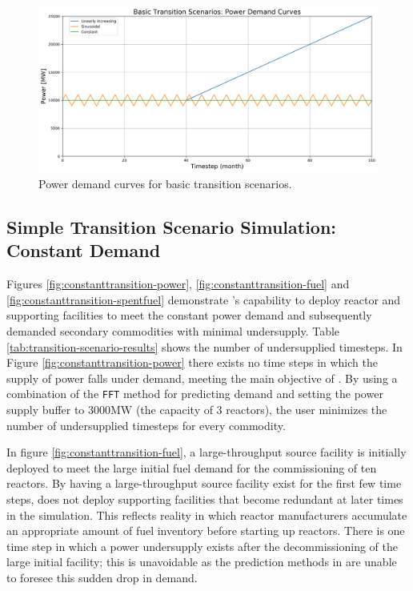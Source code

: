     \begin{figure}[]
        \begin{center}
            \includegraphics[scale=0.5]{./figures/powerplots.png}
        \end{center}
            \caption{Power demand curves for basic transition scenarios.}
        \label{fig:powerplots}
    \end{figure}

\subsection{Simple Transition Scenario Simulation: Constant Demand}
Figures \ref{fig:constanttransition-power}, \ref{fig:constanttransition-fuel}
and \ref{fig:constanttransition-spentfuel} demonstrate \deploy's capability 
to deploy reactor and supporting facilities to meet the
constant power demand and subsequently demanded 
secondary commodities with minimal undersupply. 
Table \ref{tab:transition-scenario-results} shows the number of 
undersupplied timesteps. 
In Figure \ref{fig:constanttransition-power} there exists no time steps 
in which the supply of power falls under demand, meeting the main 
objective of \deploy. 
By using a combination of the \texttt{FFT} method for 
predicting demand and setting the power supply buffer to 3000MW 
(the capacity of 3 reactors), the user minimizes the number of 
undersupplied timesteps for every commodity.

In figure \ref{fig:constanttransition-fuel},
a large-throughput source facility is initially
deployed to meet the large initial fuel demand for the commissioning 
of ten reactors. 
By having a large-throughput source facility exist for the 
first few time steps, \deploy does not deploy supporting
facilities that become redundant at later times in  
the simulation.
This reflects reality in which reactor manufacturers accumulate
an appropriate amount of fuel inventory before starting 
up reactors. 
There is one time step in which a power undersupply exists after the 
decommissioning of the large initial facility; 
this is unavoidable as the prediction methods in \deploy are 
unable to foresee this sudden drop in demand. 

